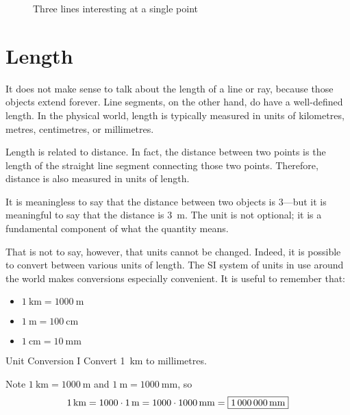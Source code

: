 \documentclass[a4paper,10pt]{report}
\begin{document}
\begin{figure}
 \fgAsterisk{}

 \caption{Three lines interesting at a single point}
 \label{an:asterisk}
\end{figure}

\section{Length}

It does not make sense to talk about the length of a line or ray, because those
objects extend forever. Line segments, on the other hand, do have a well-defined
length. In the physical world, length is typically measured in units of
kilometres, metres, centimetres, or millimetres.

Length is related to distance. In fact, the distance between two points is the
length of the straight line segment connecting those two points. Therefore,
distance is also measured in units of length.

It is meaningless to say that the distance between two objects is $3$---but it
is meaningful to say that the distance is \SI{3}{\metre}. The unit is not
optional; it is a fundamental component of what the quantity means.

That is not to say, however, that units cannot be changed. Indeed, it is
possible to convert between various units of length. The SI system of units in
use around the world makes conversions especially convenient. It is useful to
remember that:

\begin{itemize}
  \item $\SI{1}{\kilo\metre}=\SI{1000}{\metre}$
  \item $\SI{1}{\metre}=\SI{100}{\centi\metre}$
  \item $\SI{1}{\centi\metre}=\SI{10}{\milli\metre}$
\end{itemize}

\begin{problem}{Unit Conversion I}
  Convert \SI{1}{\kilo\metre} to millimetres.

  \begin{solution}
    Note \(
      \SI{1}{\kilo\metre} = \SI{1000}{\metre}
    \) and \(
      \SI{1}{\metre} = \SI{1000}{\milli\metre}
    \), so \[
      \SI{1}{\kilo\metre} = 1000 \cdot \SI{1}{\metre} = 1000 \cdot
      \SI{1000}{\milli\metre} = \Ans{\SI{1000000}{\milli\metre}}
    \]
  \end{solution}
\end{problem}
\end{document}
